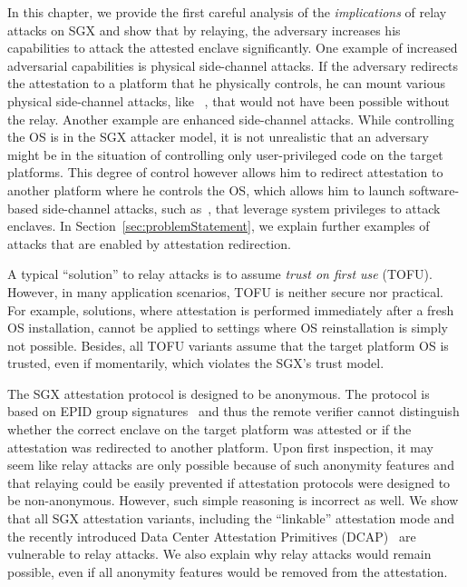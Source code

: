 In this chapter, we provide the first careful analysis of the \emph{implications} of relay attacks on SGX and show that by relaying, the adversary increases his capabilities to attack the attested enclave significantly. One example of increased adversarial capabilities is physical side-channel attacks. If the adversary redirects the attestation to a platform that he physically controls, he can mount various physical side-channel attacks, like ~\cite{genkin2016physical,wang2006covert,gandolfi2001electromagnetic, shamir2004acoustic}, that would not have been possible without the relay. Another example are enhanced side-channel attacks. While controlling the OS is in the SGX attacker model, it is not unrealistic that an adversary might be in the situation of controlling only user-privileged code on the target platforms. This degree of control however allows him to redirect attestation to another platform where he controls the OS, which allows him to launch software-based side-channel attacks, such as~\cite{moghimi2017cachezoom, sgxcache, gotzfried2017cache}, that leverage system privileges to attack enclaves. In Section~\ref{sec:problemStatement}, we explain further examples of attacks that are enabled by attestation redirection.



A typical ``solution'' to relay attacks is to assume \emph{trust on first use} (TOFU). However, in many application scenarios, TOFU is neither secure nor practical. For example, solutions, where attestation is performed immediately after a fresh OS installation, cannot be applied to settings where OS reinstallation is simply not possible. Besides, all TOFU variants assume that the target platform OS is trusted, even if momentarily, which violates the SGX's trust model. %



The SGX attestation protocol is designed to be anonymous. The protocol is based on EPID group signatures~\cite{epid_attestation} and thus the remote verifier cannot distinguish whether the correct enclave on the target platform was attested or if the attestation was redirected to another platform. Upon first inspection, it may seem like relay attacks are only possible because of such anonymity features and that relaying could be easily prevented if attestation protocols were designed to be non-anonymous. However, such simple reasoning is incorrect as well. 
%
We show that all SGX attestation variants, including the ``linkable'' attestation mode and the recently introduced Data Center Attestation Primitives (DCAP)~\cite{DCAP} are vulnerable to relay attacks. We also explain why relay attacks would remain possible, even if all anonymity features would be removed from the attestation.



